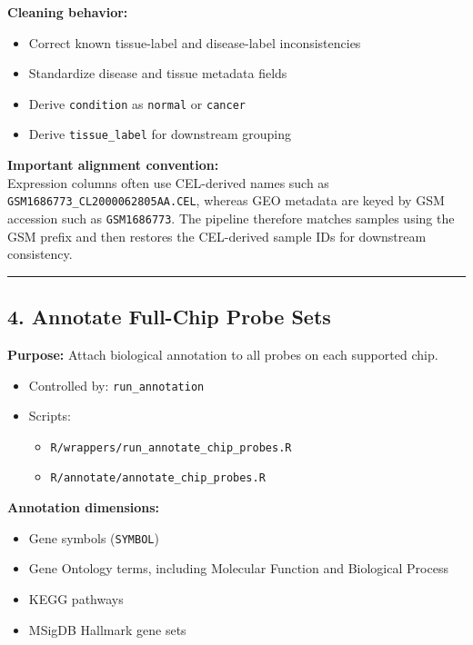 \documentclass[
  letterpaper,
  DIV=11,
  numbers=noendperiod,
  openany,
  oneside]{scrreprt}
\providecommand{\tightlist}{%
  \setlength{\itemsep}{0pt}\setlength{\parskip}{0pt}}
\begin{document}
\textbf{Cleaning behavior:}

\begin{itemize}
\tightlist
\item
  Correct known tissue-label and disease-label inconsistencies
\item
  Standardize disease and tissue metadata fields
\item
  Derive \texttt{condition} as \texttt{normal} or \texttt{cancer}
\item
  Derive \texttt{tissue\_label} for downstream grouping
\end{itemize}

\textbf{Important alignment convention:}\\
Expression columns often use CEL-derived names such as
\texttt{GSM1686773\_CL2000062805AA.CEL}, whereas GEO metadata are keyed
by GSM accession such as \texttt{GSM1686773}. The pipeline therefore
matches samples using the GSM prefix and then restores the CEL-derived
sample IDs for downstream consistency.

\begin{center}\rule{0.5\linewidth}{0.5pt}\end{center}

\subsection*{4. Annotate Full-Chip Probe
Sets}\label{annotate-full-chip-probe-sets}

\textbf{Purpose:} Attach biological annotation to all probes on each
supported chip.

\begin{itemize}
\tightlist
\item
  Controlled by: \texttt{run\_annotation}
\item
  Scripts:

  \begin{itemize}
  \tightlist
  \item
    \texttt{R/wrappers/run\_annotate\_chip\_probes.R}
  \item
    \texttt{R/annotate/annotate\_chip\_probes.R}
  \end{itemize}
\end{itemize}

\textbf{Annotation dimensions:}

\begin{itemize}
\tightlist
\item
  Gene symbols (\texttt{SYMBOL})
\item
  Gene Ontology terms, including Molecular Function and Biological
  Process
\item
  KEGG pathways
\item
  MSigDB Hallmark gene sets
\end{itemize}
\end{document}
